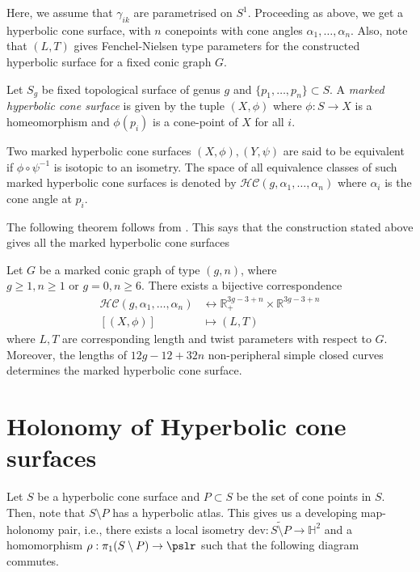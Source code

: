 Here, we assume that $\gamma_{ik}$ are parametrised on $S^1$. Proceeding as above, we get a hyperbolic cone surface, with $n$ conepoints with cone angles $\alpha_1, \ldots, \alpha_n$. Also, note that $(L,T)$ gives Fenchel-Nielsen type parameters for the constructed hyperbolic surface for a fixed conic graph $G$.

\begin{defn}
	Let $S_g$ be fixed topological surface of genus $g$ and $\{p_1, \ldots,p_n\} \subset S$. A \textit{marked hyperbolic cone surface} is given by the tuple $(X, \phi)$ where $ \phi: S \rightarrow X$ is a homeomorphism and $\phi(p_i)$ is a cone-point of $X$ for all $i$.
\end{defn}

Two marked hyperbolic cone surfaces $(X, \phi), (Y, \psi)$ are said to be equivalent if $\phi \circ \psi^{-1}$ is isotopic to an isometry. The space of all equivalence classes of such marked hyperbolic cone surfaces is denoted by $\mathcal{HC}(g, \alpha_1,\ldots,\alpha_n)$ where $\alpha_i$ is the cone angle at $p_i$.

The following theorem follows from \cite[Section 3]{HuipingPan}. This says that the construction stated above gives all the marked hyperbolic cone surfaces

\begin{theorem}\label{thm:FNCoordinates}
	Let $G$ be a marked conic graph of type $(g,n)$, where $g \geq 1, n \geq 1 \text{ or } g = 0, n \geq 6 $. There exists a bijective correspondence
	\begin{align*}
		\mathcal{HC}(g, \alpha_1,\ldots,\alpha_n) &\longleftrightarrow \mathbb{R}_+^{3g-3+n} \times \mathbb{R}^{3g-3+n} \\
		[(X, \phi)] &\mapsto (L,T)
	\end{align*}
	where $L, T$ are corresponding length and twist parameters with respect to $G$. 
	Moreover, the lengths of $12g-12+32n$ non-peripheral simple closed curves determines the marked hyperbolic cone surface.
\end{theorem}

\section{Holonomy of Hyperbolic cone surfaces} \label{sec:holonomy_of_hyp_surfaces}

Let $S$ be a hyperbolic cone surface and $P \subset S$ be the set of cone points in $S$. Then, note that $S \setminus P$ has a hyperbolic atlas. This gives us a developing map-holonomy pair, i.e., there exists a local isometry $\text{dev}: \widetilde{S\setminus P} \rightarrow \mathbb{H}^2$ and a homomorphism 
$\rho: \pi_1(S \setminus P) \rightarrow \pslr$ such that the following diagram commutes.

